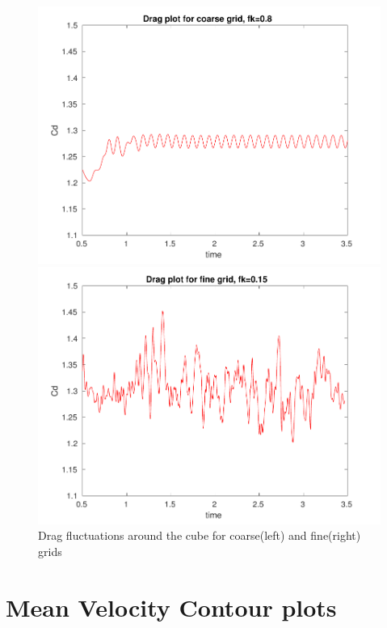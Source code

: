 \begin{figure}[H]
\begin{minipage}[b]{0.5\linewidth}
\includegraphics[scale=0.5]{figure/coarse/cd_coarse.pdf}
\end{minipage}
\begin{minipage}[b]{0.5\linewidth}
\includegraphics[scale=0.5]{figure/fine/cd_fine.pdf}
\end{minipage}
\caption{Drag fluctuations around the cube for coarse(left) and fine(right) grids}
\label{fig:41}
\end{figure}



\section{Mean Velocity Contour plots}

